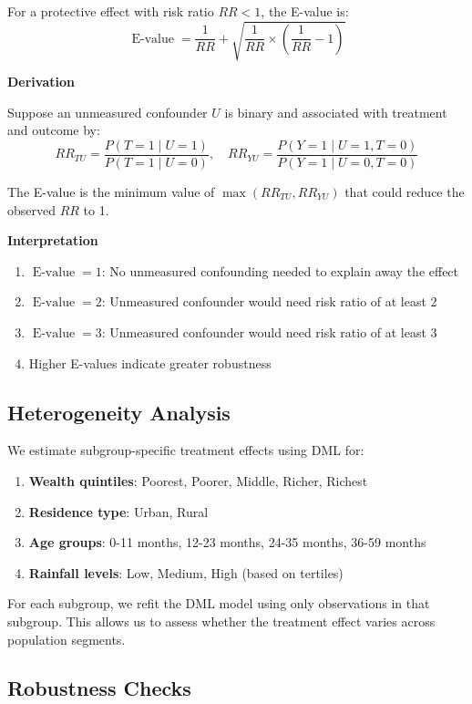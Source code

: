 For a protective effect with risk ratio $RR < 1$, the E-value is:
\[
\operatorname{E-value} = \frac{1}{RR} + \sqrt{\frac{1}{RR} \times \left(\frac{1}{RR} - 1\right)}
\]

\textbf{Derivation}

Suppose an unmeasured confounder $U$ is binary and associated with treatment and outcome by:
\[
RR_{TU} = \frac{P(T=1 \mid U=1)}{P(T=1 \mid U=0)}, \quad RR_{YU} = \frac{P(Y=1 \mid U=1, T=0)}{P(Y=1 \mid U=0, T=0)}
\]

The E-value is the minimum value of $\max(RR_{TU}, RR_{YU})$ that could reduce the observed $RR$ to 1.

\textbf{Interpretation}

\begin{enumerate}
	\item $\operatorname{E-value} = 1$: No unmeasured confounding needed to explain away the effect
	\item $\operatorname{E-value} = 2$: Unmeasured confounder would need risk ratio of at least 2
	\item $\operatorname{E-value} = 3$: Unmeasured confounder would need risk ratio of at least 3
	\item Higher E-values indicate greater robustness
\end{enumerate}

\subsection{Heterogeneity Analysis}

We estimate subgroup-specific treatment effects using DML for:

\begin{enumerate}
	\item \textbf{Wealth quintiles}: Poorest, Poorer, Middle, Richer, Richest
	\item \textbf{Residence type}: Urban, Rural
	\item \textbf{Age groups}: 0-11 months, 12-23 months, 24-35 months, 36-59 months
	\item \textbf{Rainfall levels}: Low, Medium, High (based on tertiles)
\end{enumerate}

For each subgroup, we refit the DML model using only observations in that subgroup. This allows us to assess whether the treatment effect varies across population segments.

\subsection{Robustness Checks}

